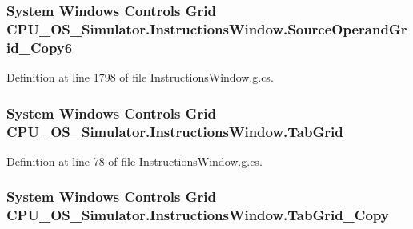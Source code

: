 \subsubsection[{Source\+Operand\+Grid\+\_\+\+Copy6}]{\setlength{\rightskip}{0pt plus 5cm}System Windows Controls Grid C\+P\+U\+\_\+\+O\+S\+\_\+\+Simulator.\+Instructions\+Window.\+Source\+Operand\+Grid\+\_\+\+Copy6\hspace{0.3cm}{\ttfamily [package]}}\label{class_c_p_u___o_s___simulator_1_1_instructions_window_a3dfdd68ad6b08fb1612fd43a420e5193}


Definition at line 1798 of file Instructions\+Window.\+g.\+cs.

\hypertarget{class_c_p_u___o_s___simulator_1_1_instructions_window_a8e5436d90df63837c7f39586855bda1b}{}
\subsubsection[{Tab\+Grid}]{\setlength{\rightskip}{0pt plus 5cm}System Windows Controls Grid C\+P\+U\+\_\+\+O\+S\+\_\+\+Simulator.\+Instructions\+Window.\+Tab\+Grid\hspace{0.3cm}{\ttfamily [package]}}\label{class_c_p_u___o_s___simulator_1_1_instructions_window_a8e5436d90df63837c7f39586855bda1b}


Definition at line 78 of file Instructions\+Window.\+g.\+cs.

\hypertarget{class_c_p_u___o_s___simulator_1_1_instructions_window_a0f8731825bc5369e0328b2b9580e9b67}{}
\subsubsection[{Tab\+Grid\+\_\+\+Copy}]{\setlength{\rightskip}{0pt plus 5cm}System Windows Controls Grid C\+P\+U\+\_\+\+O\+S\+\_\+\+Simulator.\+Instructions\+Window.\+Tab\+Grid\+\_\+\+Copy\hspace{0.3cm}{\ttfamily [package]}}\label{class_c_p_u___o_s___simulator_1_1_instructions_window_a0f8731825bc5369e0328b2b9580e9b67}


